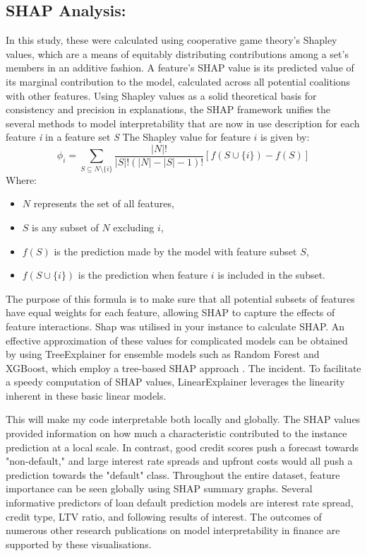 \documentclass[12pt, a4paper,oneside]{book}
\numberwithin{equation}{section}
\begin{document}
\subsection{SHAP Analysis:}
In this study, these were calculated using cooperative game theory's Shapley values, which are a means of equitably distributing contributions among a set's members in an additive fashion. A feature's SHAP value is its predicted value of its marginal contribution to the model, calculated across all potential coalitions with other features. Using Shapley values as a solid theoretical basis for consistency and precision in explanations, the SHAP framework unifies the several methods to model interpretability that are now in use \cite{lundberg2018consistent} description for each feature \textit{i} in a feature set \textit{S} The Shapley value for feature 
\( i \) is given by:
\[
\phi_i = \sum_{S \subseteq N \setminus \{i\}} \frac{|N|!}{|S|!(|N| - |S| - 1)!} [f(S \cup \{i\}) - f(S)]
\]
Where:
\begin{itemize}
    \item \( N \) represents the set of all features,
    \item \( S \) is any subset of \( N \) excluding \( i \),
    \item \( f(S) \) is the prediction made by the model with feature subset \( S \),
    \item \( f(S \cup \{i\}) \) is the prediction when feature \( i \) is included in the subset.
\end{itemize}
The purpose of this formula is to make sure that all potential subsets of features have equal weights for each feature, allowing SHAP to capture the effects of feature interactions. Shap was utilised in your instance to calculate SHAP. An effective approximation of these values for complicated models can be obtained by using TreeExplainer for ensemble models such as Random Forest and XGBoost, which employ a tree-based SHAP approach \cite{lundberg2018consistent}. The incident. To facilitate a speedy computation of SHAP values, LinearExplainer leverages the linearity inherent in these basic linear models.

This will make my code interpretable both locally and globally. The SHAP values provided information on how much a characteristic contributed to the instance prediction at a local scale. In contrast, good credit scores push a forecast towards "non-default," and large interest rate spreads and upfront costs would all push a prediction towards the "default" class. Throughout the entire dataset, feature importance can be seen globally using SHAP summary graphs. Several informative predictors of loan default prediction models are interest rate spread, credit type, LTV ratio, and following results of interest. The outcomes of numerous other research publications on model interpretability in finance are supported by these visualisations.
\end{document}
